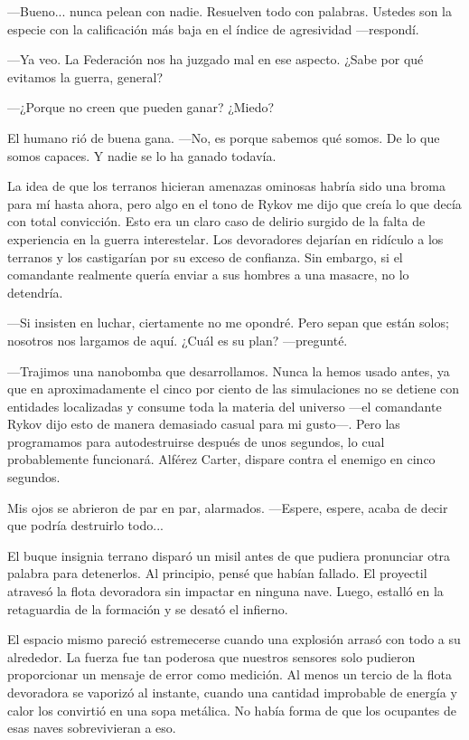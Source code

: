 —Bueno... nunca pelean con nadie. Resuelven todo con palabras. Ustedes son la especie con la calificación más baja en el índice de agresividad —respondí.

—Ya veo. La Federación nos ha juzgado mal en ese aspecto. ¿Sabe por qué evitamos la guerra, general?

 —¿Porque no creen que pueden ganar? ¿Miedo?

El humano rió de buena gana. —No, es porque sabemos qué somos. De lo que somos capaces. Y nadie se lo ha ganado todavía.

La idea de que los terranos hicieran amenazas ominosas habría sido una broma para mí hasta ahora, pero algo en el tono de Rykov me dijo que creía lo que decía con total convicción. Esto era un claro caso de delirio surgido de la falta de experiencia en la guerra interestelar. Los devoradores dejarían en ridículo a los terranos y los castigarían por su exceso de confianza. Sin embargo, si el comandante realmente quería enviar a sus hombres a una masacre, no lo detendría.

—Si insisten en luchar, ciertamente no me opondré. Pero sepan que están solos; nosotros nos largamos de aquí. ¿Cuál es su plan? —pregunté.

—Trajimos una nanobomba que desarrollamos. Nunca la hemos usado antes, ya que en aproximadamente el cinco por ciento de las simulaciones no se detiene con entidades localizadas y consume toda la materia del universo —el comandante Rykov dijo esto de manera demasiado casual para mi gusto—. Pero las programamos para autodestruirse después de unos segundos, lo cual probablemente funcionará. Alférez Carter, dispare contra el enemigo en cinco segundos.

Mis ojos se abrieron de par en par, alarmados. —Espere, espere, acaba de decir que podría destruirlo todo...

El buque insignia terrano disparó un misil antes de que pudiera pronunciar otra palabra para detenerlos. Al principio, pensé que habían fallado. El proyectil atravesó la flota devoradora sin impactar en ninguna nave. Luego, estalló en la retaguardia de la formación y se desató el infierno.

El espacio mismo pareció estremecerse cuando una explosión arrasó con todo a su alrededor. La fuerza fue tan poderosa que nuestros sensores solo pudieron proporcionar un mensaje de error como medición. Al menos un tercio de la flota devoradora se vaporizó al instante, cuando una cantidad improbable de energía y calor los convirtió en una sopa metálica. No había forma de que los ocupantes de esas naves sobrevivieran a eso.

